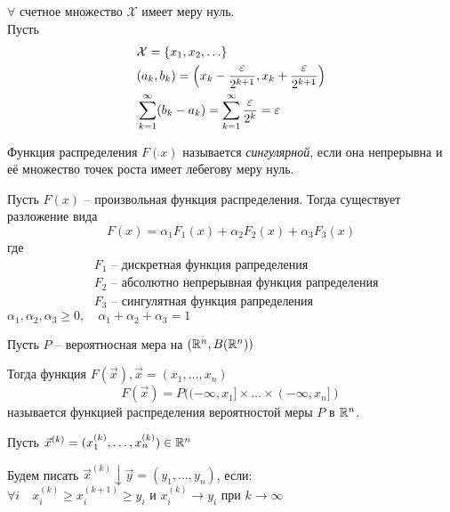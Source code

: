 \begin{example}
	$\forall$ счетное множество $\mathcal{X}$ имеет меру нуль.\\
	Пусть 
		\begin{align*}			
			&\mathcal{X} = \{ x_1, x_2, \ldots \}\\
			&(a_k, b_k) = \left( x_k - \frac{\varepsilon}{2^{k + 1}}, x_k + \frac{\varepsilon}{2^{k + 1}} \right)\\
			&\sum_{k = 1}^{\infty} (b_k - a_k) = \sum_{k = 1}^{\infty} \frac{\varepsilon}{2^k} = \varepsilon
		\end{align*}	
\end{example}

\begin{definition}
	Функция распределения $F(x)$ называется \emph{сингулярной}, 
	если она непрерывна и её множество точек роста имеет лебегову меру нуль.
\end{definition}

\begin{theorem}[Лебег]
	Пусть $F(x)$ -- произвольная функция распределения. Тогда существует разложение вида
	\begin{equation*}
		F(x) = \alpha_1 F_1(x) + \alpha_2 F_2(x) + \alpha_3 F_3(x)
	\end{equation*}	 
	где 
	\begin{align*}
		&F_1 \text{ -- дискретная функция рапределения}\\
		&F_2 \text{ -- абсолютно непрерывная функция рапределения}\\
		&F_3 \text{ -- сингулятная функция рапределения}
	\end{align*}
	$\alpha_1, \alpha_2, \alpha_3 \geq 0,\quad \alpha_1 + \alpha_2 + \alpha_3 = 1$
\end{theorem}


\begin{definition}
	Пусть $P$ -- вероятносная мера на $(\mathbb{R}^n , B(\mathbb{R}^n))$

	Тогда функция $F(\vec{x}), \vec{x} = (x_1, \ldots, x_n)$
	\begin{equation*}
		F(\vec{x}) = P((-\infty, x_1] \times \ldots \times (-\infty, x_n])
	\end{equation*}
	называется функцией распределения вероятностой меры $P$ в $\mathbb{R}^n$.
\end{definition}

\begin{designations}
	Пусть $\vec{x}^{(k)} = (x_1^{(k)}, \ldots, x_n^{(k)}) \in \mathbb{R}^n$

	Будем писать $\vec{x}^{(k)} \downarrow \vec{y} = (y_1, \ldots, y_n)$, если:\\
	$\forall i \quad x_i^{(k)} \geq x_i^{(k + 1)} \geq y_i$ и $x_i^{(k)} \to y_i$ при $k \to \infty$
\end{designations}

